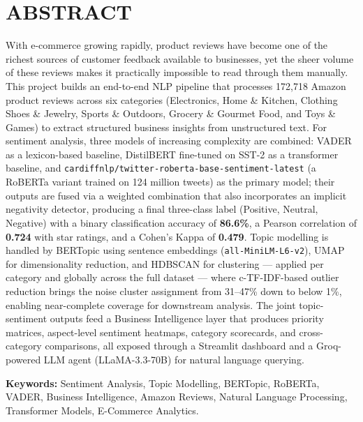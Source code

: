 \newpage
\section*{ABSTRACT}
\begin{justify}

With e-commerce growing rapidly, product reviews have become one of the richest sources of customer feedback available to businesses, yet the sheer volume of these reviews makes it practically impossible to read through them manually. This project builds an end-to-end NLP pipeline that processes 172,718 Amazon product reviews across six categories (Electronics, Home \& Kitchen, Clothing Shoes \& Jewelry, Sports \& Outdoors, Grocery \& Gourmet Food, and Toys \& Games) to extract structured business insights from unstructured text. For sentiment analysis, three models of increasing complexity are combined: VADER as a lexicon-based baseline, DistilBERT fine-tuned on SST-2 as a transformer baseline, and \texttt{cardiffnlp/twitter-roberta-base-\allowbreak{}sentiment-latest} (a RoBERTa variant trained on 124 million tweets) as the primary model; their outputs are fused via a weighted combination that also incorporates an implicit negativity detector, producing a final three-class label (Positive, Neutral, Negative) with a binary classification accuracy of \textbf{86.6\%}, a Pearson correlation of \textbf{0.724} with star ratings, and a Cohen's Kappa of \textbf{0.479}. Topic modelling is handled by BERTopic using sentence embeddings (\texttt{all-MiniLM-L6-v2}), UMAP for dimensionality reduction, and HDBSCAN for clustering — applied per category and globally across the full dataset — where c-TF-IDF-based outlier reduction brings the noise cluster assignment from 31--47\% down to below 1\%, enabling near-complete coverage for downstream analysis. The joint topic-sentiment outputs feed a Business Intelligence layer that produces priority matrices, aspect-level sentiment heatmaps, category scorecards, and cross-category comparisons, all exposed through a Streamlit dashboard and a Groq-powered LLM agent (LLaMA-3.3-70B) for natural language querying.

\vspace{0.5cm}

\textbf{Keywords:} Sentiment Analysis, Topic Modelling, BERTopic, RoBERTa, VADER, Business Intelligence, Amazon Reviews, Natural Language Processing, Transformer Models, E-Commerce Analytics.

\vspace{0.5cm}


\end{justify}
